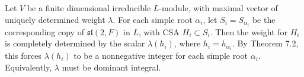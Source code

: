 Let $V$ be a finite dimensional irreducible $L$-module, with maximal vector of uniquely determined weight $\lambda$. For each simple root $\alpha_i$, let $S_i = S_{\alpha_i}$ be the corresponding copy of $\mathfrak{sl}(2, F)$ in $L$, with CSA $H_i \subset S_i$. Then the weight for $H_i$ is completely determined by the scalar $\lambda(h_i)$, where $h_i = h_{\alpha_i}$. By Theorem 7.2, this forces $\lambda(h_i)$ to be a nonnegative integer for each simple root $\alpha_i$. Equivalently, $\lambda$ must be dominant integral.
